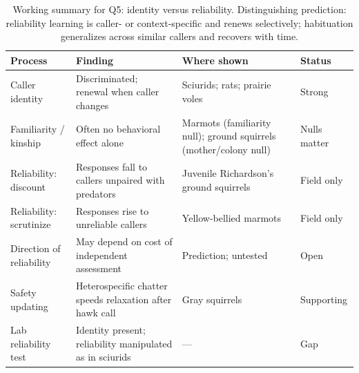 \begin{table}[tbp]
\centering
\footnotesize
\singlespacing
\caption{Working summary for Q5: identity versus reliability. Distinguishing prediction: reliability learning is caller- or context-specific and renews selectively; habituation generalizes across similar callers and recovers with time.}
\label{tab:summary-q5}
\begin{tabular}{@{}p{1.3in}p{2.4in}p{1.4in}p{0.9in}@{}}
\toprule
\textbf{Process} & \textbf{Finding} & \textbf{Where shown} & \textbf{Status} \\
\midrule
Caller identity & Discriminated; renewal when caller changes & Sciurids; rats; prairie voles & Strong \\
\addlinespace[2pt]
Familiarity / kinship & Often no behavioral effect alone & Marmots (familiarity null); ground squirrels (mother/colony null) & Nulls matter \\
\addlinespace[2pt]
Reliability: discount & Responses fall to callers unpaired with predators & Juvenile Richardson's ground squirrels & Field only \\
\addlinespace[2pt]
Reliability: scrutinize & Responses rise to unreliable callers & Yellow-bellied marmots & Field only \\
\addlinespace[2pt]
Direction of reliability & May depend on cost of independent assessment & Prediction; untested & Open \\
\addlinespace[2pt]
Safety updating & Heterospecific chatter speeds relaxation after hawk call & Gray squirrels & Supporting \\
\addlinespace[2pt]
Lab reliability test & Identity present; reliability manipulated as in sciurids & --- & Gap \\
\bottomrule
\end{tabular}
\end{table}
